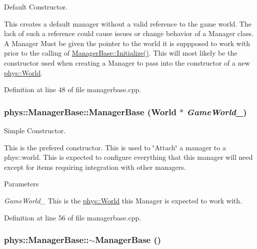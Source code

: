 Default Constructor. 

This creates a default manager without a valid reference to the game world. The lack of such a reference could cause issues or change behavior of a Manager class. A Manager Must be given the pointer to the world it is suppposed to work with prior to the calling of \hyperlink{classphys_1_1ManagerBase_a57dd8e54e767427d5bdcc86dc66d73ed}{ManagerBase::Initialize()}. This will most likely be the constructor used when creating a Manager to pass into the constructor of a new \hyperlink{classphys_1_1World}{phys::World}. 

Definition at line 48 of file managerbase.cpp.

\hypertarget{classphys_1_1ManagerBase_ab9ad12416f771d95fe8a6d953923c634}{
\subsubsection[{ManagerBase}]{\setlength{\rightskip}{0pt plus 5cm}phys::ManagerBase::ManagerBase ({\bf World} $\ast$ {\em GameWorld\_\-})}}
\label{d2/de3/classphys_1_1ManagerBase_ab9ad12416f771d95fe8a6d953923c634}


Simple Constructor. 

This is the prefered constructor. This is used to \char`\"{}Attach\char`\"{} a manager to a phys::world. This is expected to configure everything that this manager will need except for items requiring integration with other managers. 
\begin{DoxyParams}{Parameters}
\item[{\em GameWorld\_\-}]This is the \hyperlink{classphys_1_1World}{phys::World} this Manager is expected to work with. \end{DoxyParams}


Definition at line 56 of file managerbase.cpp.

\hypertarget{classphys_1_1ManagerBase_a802dace8381459637297e9a372bfdf0c}{
\subsubsection[{$\sim$ManagerBase}]{\setlength{\rightskip}{0pt plus 5cm}phys::ManagerBase::$\sim$ManagerBase ()}}
\label{d2/de3/classphys_1_1ManagerBase_a802dace8381459637297e9a372bfdf0c}


